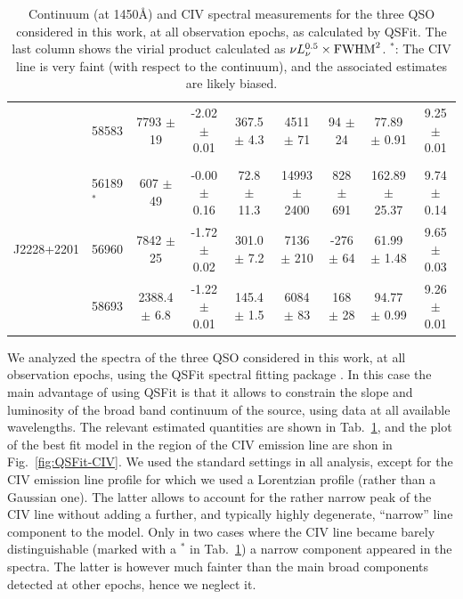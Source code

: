 \documentclass{article}
\begin{document}
\begin{table}
\begin{centering}
\begin{tabular}{l | l | c c | c c c c | c}
                       &  58583       &   7793   $\pm$ 19      &  -2.02 $\pm$ 0.01                   &  367.5  $\pm$  4.3       &   4511 $\pm$   71  &      94 $\pm$  24   &   77.89 $\pm$  0.91  &   9.25 $\pm$ 0.01\\  
                                      &                        &                                     &                          &                    &                     &                      &                  \\
                       &  56189$^*$   &    607   $\pm$ 49      &  -0.00 $\pm$ 0.16                   &   72.8  $\pm$ 11.3       &  14993 $\pm$ 2400  &     828 $\pm$ 691   &  162.89 $\pm$ 25.37  &   9.74 $\pm$ 0.14\\  
          J2228+2201   &  56960       &   7842   $\pm$ 25      &  -1.72 $\pm$ 0.02                   &  301.0  $\pm$  7.2       &   7136 $\pm$  210  &    -276 $\pm$  64   &   61.99 $\pm$  1.48  &   9.65 $\pm$ 0.03\\ 
                       &  58693       &   2388.4 $\pm$  6.8    &  -1.22 $\pm$ 0.01                   &  145.4  $\pm$  1.5       &   6084 $\pm$   83  &     168 $\pm$  28   &   94.77 $\pm$  0.99  &   9.26 $\pm$ 0.01\\  
      \hline
      \hline
    \end{tabular}
    \caption{Continuum (at 1450\AA) and CIV spectral measurements for the three QSO considered in this work, at all observation epochs, as calculated by QSFit.  The last column shows the virial product calculated as $\nu L_{\nu}^{0.5} \times {\rm FWHM}^2$.  $^*$: The CIV line is very faint (with respect to the continuum), and the associated estimates are likely biased.}
    \label{tab:QSFit-results}
  \end{centering}
\end{table}

We analyzed the spectra of the three QSO considered in this work, at all observation epochs, using the QSFit spectral fitting package \citep{Calderone2017}.  In this case the main advantage of using QSFit is that it allows to constrain the slope and luminosity of the broad band continuum of the source, using data at all available wavelengths. The relevant estimated quantities are shown in Tab.~\ref{tab:QSFit-results}, and the plot of the best fit model in the region of the CIV emission line are shon in Fig.~\ref{fig:QSFit-CIV}.  We used the standard settings in all analysis, except for the CIV emission line profile for which we used a Lorentzian profile (rather than a Gaussian one).  The latter allows to account for the rather narrow peak of the CIV line without adding a further, and typically highly degenerate, ``narrow'' line component to the model.  Only in two cases where the CIV line became barely distinguishable (marked with a $^*$ in Tab.~\ref{tab:QSFit-results}) a narrow component appeared in the spectra.  The latter is however much fainter than the main broad components detected at other epochs, hence we neglect it.
\end{document}
